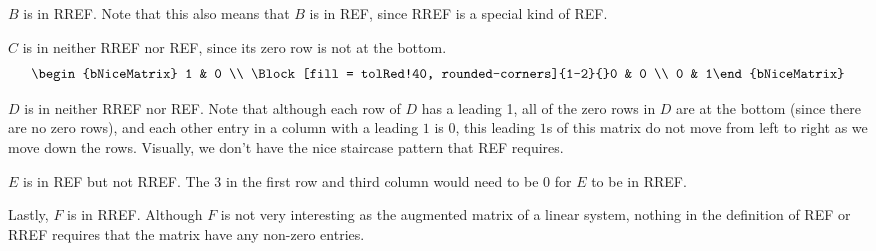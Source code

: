 \begin{example}
	\noindent $B$ is in RREF. Note that this also means that $B$ is in REF, since RREF is a special kind of REF.
	\begin{center}
	\end{center}
	
	
	\noindent $C$ is in neither RREF nor REF, since its zero row is not at the bottom.
	\[\begin{bNiceMatrix} 1 & 0 \\ \Block[fill = tolRed!40, rounded-corners]{1-2}{}0 & 0 \\ 0 & 1\end{bNiceMatrix}\]

	\noindent $D$ is in neither RREF nor REF. Note that although each row of $D$ has a leading 1, all of the zero rows in $D$ are at the bottom (since there are no zero rows), and each other entry in a column with a leading $1$ is $0$, this leading $1$s of this matrix do not move from left to right as we move down the rows. Visually, we don't have the nice staircase pattern that REF requires.
	
	\vspace{10pt}
	
	\noindent $E$ is in REF but not RREF. The $3$ in the first row and third column would need to be $0$ for $E$ to be in RREF.
	\begin{center}
	\end{center}
	
	\noindent Lastly, $F$ is in RREF. Although $F$ is not very interesting as the augmented matrix of a linear system, nothing in the definition of REF or RREF requires that the matrix have any non-zero entries.
	
\end{example}

